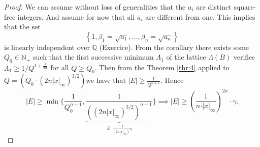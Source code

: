 \documentclass[a4paper,11pt,american]{article}
\newcommand{\N}{\mathbb{N}}
\newcommand{\Q}{\mathbb{Q}}
\theoremstyle{plain}
\theoremstyle{definition}
\begin{document}
\begin{proof}
  We can assume without loss of generalities that the $a_i$ are distinct square-free integers. And assume for now that all $a_i$ are different from one. This implies that the set
  \begin{displaymath}
    \left\{1, \beta_1 = \sqrt{a_1} ,\dots, \beta_n = \sqrt{a_n}\right\} 
  \end{displaymath}
  is linearly independent over $\Q$ (Exercice).
  From the corollary there exists some $Q_0 \in \N_+$ such that the first successive minimum $\Lambda_1$ of the lattice $\Lambda(B)$ verifies $\Lambda_1 \geq 1/Q^{1 + \frac{1}{3n}}$ for all $Q \geq Q_0$. 
Then from the Theorem \ref{thr:4} applied to $Q = (Q_0 \cdot (2n\vert  x\vert _\infty)^{3/2})$we have that $\vert E\vert \geq \frac{1}{Q^{n+1}}$. Hence $$\vert E\vert\geq\min\{\frac{1}{Q_0^{n+1}},\underbrace{\frac{1}{(\left(2 n \vert x\vert _\infty\right)^{3/2})^{n+1}}}_{\geq\frac{1}{(2 n \vert x\vert _\infty)^{2n}}}\}\implies \vert E\vert  \geq  \left( \frac{1}{n \cdot \vert x\vert _\infty}\right)^{2n} \cdot \gamma.$$ 

\end{proof}


\end{document}

